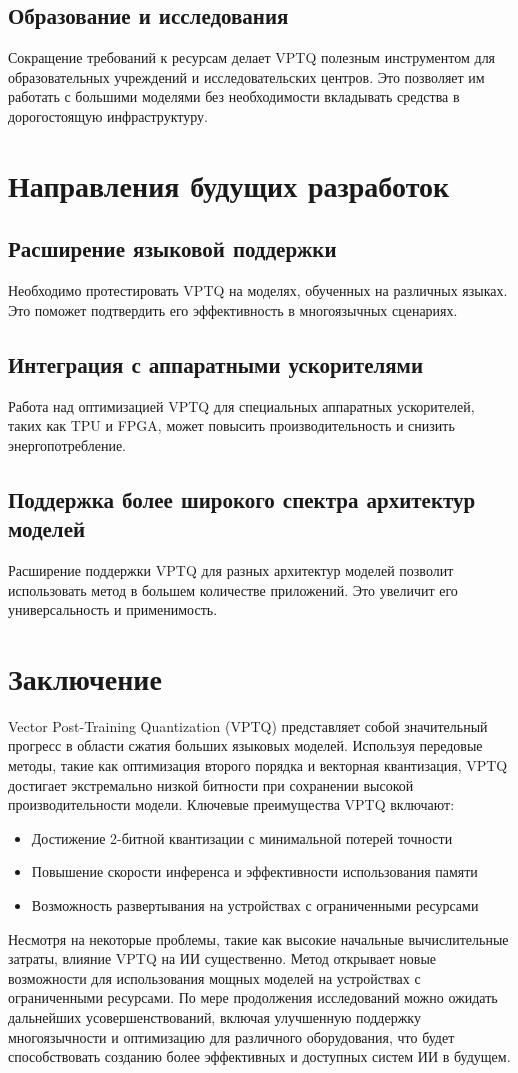 \documentclass{article}
\begin{document}
\subsection{Образование и исследования}
Сокращение требований к ресурсам делает VPTQ полезным инструментом для образовательных учреждений и исследовательских центров. Это позволяет им работать с большими моделями без необходимости вкладывать средства в дорогостоящую инфраструктуру.

\section{Направления будущих разработок}

\subsection{Расширение языковой поддержки}
Необходимо протестировать VPTQ на моделях, обученных на различных языках. Это поможет подтвердить его эффективность в многоязычных сценариях.

\subsection{Интеграция с аппаратными ускорителями}
Работа над оптимизацией VPTQ для специальных аппаратных ускорителей, таких как TPU и FPGA, может повысить производительность и снизить энергопотребление.

\subsection{Поддержка более широкого спектра архитектур моделей}
Расширение поддержки VPTQ для разных архитектур моделей позволит использовать метод в большем количестве приложений. Это увеличит его универсальность и применимость.

\section{Заключение}
Vector Post-Training Quantization (VPTQ) представляет собой значительный прогресс в области сжатия больших языковых моделей. Используя передовые методы, такие как оптимизация второго порядка и векторная квантизация, VPTQ достигает экстремально низкой битности при сохранении высокой производительности модели.
Ключевые преимущества VPTQ включают:
\begin{itemize}
\item Достижение 2-битной квантизации с минимальной потерей точности
\item Повышение скорости инференса и эффективности использования памяти
\item Возможность развертывания на устройствах с ограниченными ресурсами
\end{itemize}
Несмотря на некоторые проблемы, такие как высокие начальные вычислительные затраты, влияние VPTQ на ИИ существенно. Метод открывает новые возможности для использования мощных моделей на устройствах с ограниченными ресурсами. По мере продолжения исследований можно ожидать дальнейших усовершенствований, включая улучшенную поддержку многоязычности и оптимизацию для различного оборудования, что будет способствовать созданию более эффективных и доступных систем ИИ в будущем.
\end{document}
